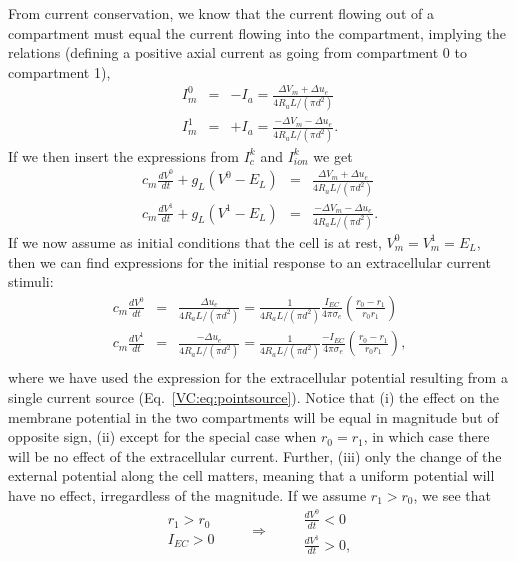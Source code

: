  
From current conservation, we know that the current flowing out of a compartment must equal the current flowing into the compartment, implying the relations (defining a positive axial current as going from compartment 0 to compartment 1),
\begin{eqnarray}
I_m^0 &=& - I_a = \frac{\Delta V_m + \Delta u_e}{4 R_a L / (\pi d^2)} \\
I_m^1 &=& + I_a =  \frac{-\Delta V_m - \Delta u_e}{4 R_a L / (\pi d^2)}.
\end{eqnarray}
If we then insert the expressions from $I^k_c$ and $I^k_{ion}$ we get
\begin{eqnarray}
c_m\frac{dV^0}{dt} + g_L (V^0 - E_L) &=& \frac{\Delta V_m + \Delta u_e}{4 R_a L / (\pi d^2)} \\
c_m\frac{dV^1}{dt} + g_L (V^1 - E_L) &=& \frac{-\Delta V_m - \Delta u_e}{4 R_a L / (\pi d^2)}.
\label{Stim:eq:two-comp-stim}
\end{eqnarray}
If we now assume as initial conditions that the cell is at rest, $V_m^0 = V_m^1 = E_L$, then we can find expressions for the initial response to an extracellular current stimuli:
\begin{eqnarray}
c_m\frac{dV^0}{dt} &=& \frac{\Delta u_e}{4 R_a L / (\pi d^2)} =  \frac{1}{4 R_a L / (\pi d^2)} \frac{I_{EC}}{4\pi \sigma_e} \left(\frac{r_0 - r_1}{r_0 r_1} \right)\\
c_m\frac{dV^1}{dt} &=& \frac{- \Delta u_e}{4 R_a L / (\pi d^2)} =  \frac{1}{4 R_a L / (\pi d^2)} \frac{-I_{EC}}{4\pi \sigma_e} \left(\frac{r_0 - r_1}{r_0 r_1} \right), \\
\end{eqnarray}
where we have used the expression for the extracellular potential resulting from a single current source (Eq.~\ref{VC:eq:pointsource}).
Notice that (i) the effect on the membrane potential in the two compartments will be equal in magnitude but of opposite sign, (ii) except for the special case when $r_0=r_1$, in which case there will be no effect of the extracellular current. Further, (iii) only the change of the external potential along the cell matters, meaning that a uniform potential will have no effect, irregardless of the magnitude. 
If we assume $r_1 > r_0$, we see that
\begin{equation}
 \begin{aligned}
        r_1>r_0\\
        I_{EC} > 0
       \end{aligned}
 \qquad \Rightarrow \qquad
 \begin{aligned}
        \frac{dV^0}{dt}<0\\
        \frac{dV^1}{dt}>0,
     \end{aligned}
\end{equation}
